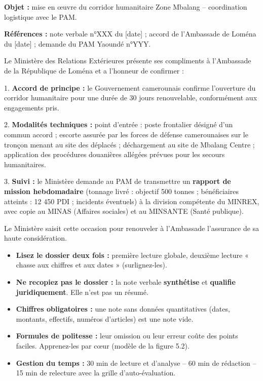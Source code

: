 \documentclass[11pt]{article}
\begin{document}
\begin{corrige}
\textbf{Objet :} mise en œuvre du corridor humanitaire Zone Mbalang -- coordination logistique avec le PAM.

\textbf{Références :} note verbale n°XXX du [date] ; accord de l'Ambassade de Loména du [date] ; demande du PAM Yaoundé n°YYY.

Le Ministère des Relations Extérieures présente ses compliments à l'Ambassade de la République de Loména et a l'honneur de confirmer :

1. \textbf{Accord de principe :} le Gouvernement camerounais confirme l'ouverture du corridor humanitaire pour une durée de 30 jours renouvelable, conformément aux engagements pris.

2. \textbf{Modalités techniques :} point d'entrée : poste frontalier désigné d'un commun accord ; escorte assurée par les forces de défense camerounaises sur le tronçon menant au site des déplacés ; déchargement au site de Mbalang Centre ; application des procédures douanières allégées prévues pour les secours humanitaires.

3. \textbf{Suivi :} le Ministère demande au PAM de transmettre un \textbf{rapport de mission hebdomadaire} (tonnage livré : objectif 500 tonnes ; bénéficiaires atteints : 12 450 PDI ; incidents éventuels) à la division compétente du MINREX, avec copie au MINAS (Affaires sociales) et au MINSANTE (Santé publique).

Le Ministère saisit cette occasion pour renouveler à l'Ambassade l'assurance de sa haute considération.
\end{corrige}

\begin{attention}
\begin{itemize}
    \item \textbf{Lisez le dossier deux fois :} première lecture globale, deuxième lecture « chasse aux chiffres et aux dates » (surlignez-les).
    \item \textbf{Ne recopiez pas le dossier :} la note verbale \textbf{synthétise} et \textbf{qualifie juridiquement}. Elle n'est pas un résumé.
    \item \textbf{Chiffres obligatoires :} une note sans données quantitatives (dates, montants, effectifs, numéros d'articles) est une note vide.
    \item \textbf{Formules de politesse :} leur omission ou leur erreur coûte des points faciles. Apprenez-les par cœur (modèle de la figure 5.2).
    \item \textbf{Gestion du temps :} 30 min de lecture et d'analyse -- 60 min de rédaction -- 15 min de relecture avec la grille d'auto-évaluation.
\end{itemize}
\end{attention}
\end{document}
